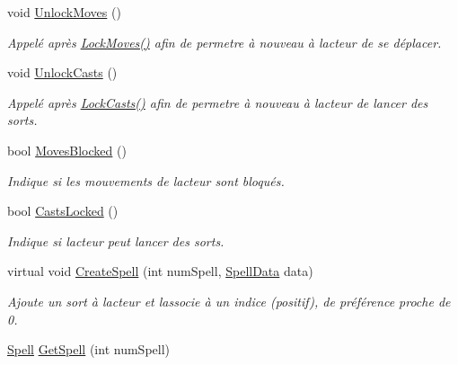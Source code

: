 \begin{DoxyCompactItemize}
void \hyperlink{class_tentacle_slicers_1_1actors_1_1_controlled_actor_a14547b4a4eff36c7d604d102b1ab30e3}{Unlock\+Moves} ()
\begin{DoxyCompactList}\small\item\em Appelé après \hyperlink{class_tentacle_slicers_1_1actors_1_1_controlled_actor_a2dece877131bcd6f29898b3b7c594524}{Lock\+Moves()} afin de permetre à nouveau à l\textquotesingle{}acteur de se déplacer. \end{DoxyCompactList}\item 
void \hyperlink{class_tentacle_slicers_1_1actors_1_1_controlled_actor_a046c8e6ce7e9d5a2cf7520939cba40a0}{Unlock\+Casts} ()
\begin{DoxyCompactList}\small\item\em Appelé après \hyperlink{class_tentacle_slicers_1_1actors_1_1_controlled_actor_a61e01e8419547521e6ed595bb4ca6226}{Lock\+Casts()} afin de permetre à nouveau à l\textquotesingle{}acteur de lancer des sorts. \end{DoxyCompactList}\item 
bool \hyperlink{class_tentacle_slicers_1_1actors_1_1_controlled_actor_a024f5552c29ca8f5c59c1c14ce7e759d}{Moves\+Blocked} ()
\begin{DoxyCompactList}\small\item\em Indique si les mouvements de l\textquotesingle{}acteur sont bloqués. \end{DoxyCompactList}\item 
bool \hyperlink{class_tentacle_slicers_1_1actors_1_1_controlled_actor_a0b22d71ca852533f95c02bb214de6567}{Casts\+Locked} ()
\begin{DoxyCompactList}\small\item\em Indique si l\textquotesingle{}acteur peut lancer des sorts. \end{DoxyCompactList}\item 
virtual void \hyperlink{class_tentacle_slicers_1_1actors_1_1_controlled_actor_afcfec115f484efa6142c2f82e1a1f4d5}{Create\+Spell} (int num\+Spell, \hyperlink{class_tentacle_slicers_1_1spells_1_1_spell_data}{Spell\+Data} data)
\begin{DoxyCompactList}\small\item\em Ajoute un sort à l\textquotesingle{}acteur et l\textquotesingle{}associe à un indice (positif), de préférence proche de 0. \end{DoxyCompactList}\item 
\hyperlink{class_tentacle_slicers_1_1spells_1_1_spell}{Spell} \hyperlink{class_tentacle_slicers_1_1actors_1_1_controlled_actor_ad5f70ea26f58c0fe2145066c9afcc4de}{Get\+Spell} (int num\+Spell)

\end{DoxyCompactItemize}
